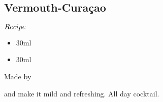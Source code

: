 \subsection{Vermouth-Cura\c{c}ao}
\begin{itembox}[l]{\boldmath $Recipe$}
\begin{itemize}
\setlength{\parskip}{0cm}
\setlength{\itemsep}{0cm}
\item \vermouth 30ml
\item \oc 30ml
\end{itemize}
\vspace{-4mm}
Made by \stir
\end{itembox}
\vermouth and \oc make it mild and refreshing. All day cocktail.
